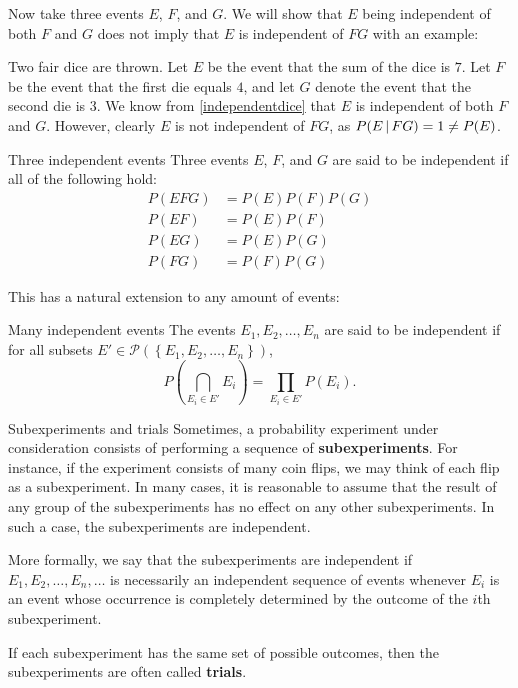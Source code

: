 Now take three events $E$, $F$, and $G$. We will show that $E$ being independent of both $F$ and $G$ does not imply that $E$ is independent of $FG$ with an example:
\begin{changebar}
    \begin{example}
        Two fair dice are thrown. Let $E$ be the event that the sum of the dice is $7$. Let $F$ be the event that the first die equals $4$, and let $G$ denote the event that the second die is $3$. We know from \autoref{independentdice} that $E$ is independent of both $F$ and $G$. However, clearly $E$ is not independent of $FG$, as $P(E \,\vert\, FG) = 1 \neq P(E)$. 
    \end{example}
\end{changebar}
\begin{bdef}{Three independent events}\label{independentthree}
    Three events $E$, $F$, and $G$ are said to be independent if all of the following hold: \[
        \begin{aligned}
            P(EFG) &= P(E)P(F)P(G) \\
            P(EF) &= P(E)P(F) \\
            P(EG) &= P(E)P(G) \\
            P(FG) &= P(F)P(G)
        \end{aligned}    
    \]
\end{bdef}
This has a natural extension to any amount of events:
\begin{bdef}{Many independent events}\label{independentmany}
    The events $E_1, E_2, \dots, E_n$ are said to be independent if for all subsets $E' \in \mathcal{P}(\left\{ E_1, E_2, \dots, E_n \right\})$, \[
        P\left(\bigcap_{E_i \in E'}E_i\right) = \prod_{E_i \in E'}P(E_i).    
    \]
\end{bdef}
\begin{bdef}{Subexperiments and trials}\label{subexperiments}
    Sometimes, a probability experiment under consideration consists of performing a sequence of \textbf{subexperiments}. For instance, if the experiment consists of many coin flips, we may think of each flip as a subexperiment. In many cases, it is reasonable to assume that the result of any group of the subexperiments has no effect on any other subexperiments. In such a case, the subexperiments are independent.

    More formally, we say that the subexperiments are independent if $E_1, E_2, \dots, E_n, \dots$ is necessarily an independent sequence of events whenever $E_i$ is an event whose occurrence is completely determined by the outcome of the $i$th subexperiment.

    If each subexperiment has the same set of possible outcomes, then the subexperiments are often called \textbf{trials}.
\end{bdef}
